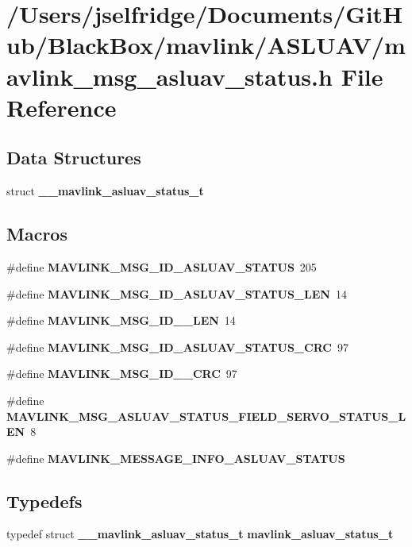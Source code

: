 \section{/\+Users/jselfridge/\+Documents/\+Git\+Hub/\+Black\+Box/mavlink/\+A\+S\+L\+U\+A\+V/mavlink\+\_\+msg\+\_\+asluav\+\_\+status.h File Reference}
\label{mavlink__msg__asluav__status_8h}
\subsection*{Data Structures}
\begin{DoxyCompactItemize}
\item 
struct \textbf{ \+\_\+\+\_\+mavlink\+\_\+asluav\+\_\+status\+\_\+t}
\end{DoxyCompactItemize}
\subsection*{Macros}
\begin{DoxyCompactItemize}
\item 
\#define \textbf{ M\+A\+V\+L\+I\+N\+K\+\_\+\+M\+S\+G\+\_\+\+I\+D\+\_\+\+A\+S\+L\+U\+A\+V\+\_\+\+S\+T\+A\+T\+US}~205
\item 
\#define \textbf{ M\+A\+V\+L\+I\+N\+K\+\_\+\+M\+S\+G\+\_\+\+I\+D\+\_\+\+A\+S\+L\+U\+A\+V\+\_\+\+S\+T\+A\+T\+U\+S\+\_\+\+L\+EN}~14
\item 
\#define \textbf{ M\+A\+V\+L\+I\+N\+K\+\_\+\+M\+S\+G\+\_\+\+I\+D\+\_\+\_\+\+L\+EN}~14
\item 
\#define \textbf{ M\+A\+V\+L\+I\+N\+K\+\_\+\+M\+S\+G\+\_\+\+I\+D\+\_\+\+A\+S\+L\+U\+A\+V\+\_\+\+S\+T\+A\+T\+U\+S\+\_\+\+C\+RC}~97
\item 
\#define \textbf{ M\+A\+V\+L\+I\+N\+K\+\_\+\+M\+S\+G\+\_\+\+I\+D\+\_\+\_\+\+C\+RC}~97
\item 
\#define \textbf{ M\+A\+V\+L\+I\+N\+K\+\_\+\+M\+S\+G\+\_\+\+A\+S\+L\+U\+A\+V\+\_\+\+S\+T\+A\+T\+U\+S\+\_\+\+F\+I\+E\+L\+D\+\_\+\+S\+E\+R\+V\+O\+\_\+\+S\+T\+A\+T\+U\+S\+\_\+\+L\+EN}~8
\item 
\#define \textbf{ M\+A\+V\+L\+I\+N\+K\+\_\+\+M\+E\+S\+S\+A\+G\+E\+\_\+\+I\+N\+F\+O\+\_\+\+A\+S\+L\+U\+A\+V\+\_\+\+S\+T\+A\+T\+US}
\end{DoxyCompactItemize}
\subsection*{Typedefs}
\begin{DoxyCompactItemize}
\item 
typedef struct \textbf{ \+\_\+\+\_\+mavlink\+\_\+asluav\+\_\+status\+\_\+t} \textbf{ mavlink\+\_\+asluav\+\_\+status\+\_\+t}
\end{DoxyCompactItemize}


